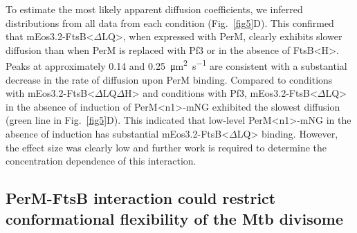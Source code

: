 \documentclass[pdflatex,sn-nature]{sn-jnl}%
\def\textsuperscript#1{<#1>}%
\newcommand\mtb{Mtb}
\newcommand\ftsbH{FtsB\textsuperscript{H}}
\newcommand\ftsbdLQ{FtsB\textsuperscript{$\Delta{}$LQ}}
\newcommand\ftsbdLQdH{FtsB\textsuperscript{$\Delta{}$LQ$\Delta{}$H}}
\newcommand\permN{PerM\textsuperscript{n1}}
\begin{document}

To estimate the most likely apparent diffusion coefficients, we inferred distributions from all data from each condition (Fig.~\ref{fig5}D).
This confirmed that mEos3.2-\ftsbdLQ{}, when expressed with PerM, clearly exhibits slower diffusion than when PerM is replaced with Pf3 or in the absence of \ftsbH{}.
Peaks at approximately 0.14 and \qty{0.25}{\square\um\per\s} are consistent with a substantial decrease in the rate of diffusion upon PerM binding.
Compared to conditions with mEos3.2-\ftsbdLQdH{} and conditions with Pf3, mEos3.2-\ftsbdLQ{} in the absence of induction of \permN{}-mNG exhibited the slowest diffusion (green line in Fig.~\ref{fig5}D).
This indicated that low-level \permN{}-mNG in the absence of induction has substantial mEos3.2-\ftsbdLQ{} binding.
However, the effect size was clearly low and further work is required to determine the concentration dependence of this interaction.

\subsection{PerM-FtsB interaction could restrict conformational flexibility of the \mtb{} divisome}
\end{document}
